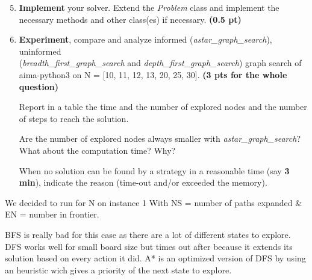 \documentclass[11pt,a4paper]{report}
\begin{document}
\begin{enumerate}
\setcounter{enumi}{4}
\item \textbf{Implement} your solver. Extend the \emph{Problem} class and implement 
		the necessary methods and other class(es) if necessary.  \textbf{(0.5 pt)}
\item \textbf{Experiment}, compare and analyze informed (\emph{astar\_graph\_search}), uninformed \\
    (\emph{breadth\_first\_graph\_search} and \emph{depth\_first\_graph\_search}) graph search of aima-python3 on N = [10, 11, 12, 13, 20, 25, 30]. \textbf{(3 pts for the whole question)}
		
		Report in a table the time and the number of explored nodes and the number of 
		steps to reach the solution.
		
		Are the number of explored nodes always smaller with 
		\emph{astar\_graph\_search}? 
		What about the computation time? 
		Why? 
		 
		 When no solution can be found by a strategy in a reasonable time (say \textbf{3 
		 min}), indicate the reason (time-out and/or exceeded the memory).
\end{enumerate}

\begin{answers}[8cm]
	We decided to run for N on instance 1 With NS = number of paths expanded \& EN = number in frontier.
	
	\hspace{0.5cm}
	
	BFS is really bad for this case as there are a lot of different states to explore. DFS works well for small board size but times out after because it extends its solution based on every action it did. A* is an optimized version of DFS by using an heuristic wich gives a priority of the next state to explore.
\end{answers}

~ 
\end{document}
